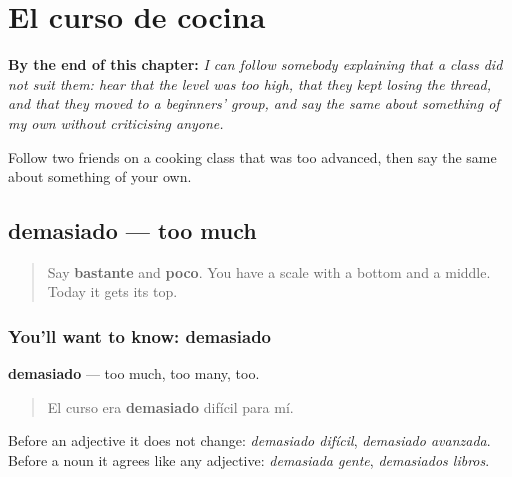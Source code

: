 
\chapter{El curso de cocina}
\label{ch:es-curso}

\begin{chapteropening}
\textbf{By the end of this chapter:} \emph{I can follow somebody explaining that a class did not suit them: hear that the level was too high, that they kept losing the thread, and that they moved to a beginners' group, and say the same about something of my own without criticising anyone.}

Follow two friends on a cooking class that was too advanced, then say the same about something of your own.
\end{chapteropening}

\section[demasiado]{demasiado — too much}

\label{lesson:ES-C471-demasiado}



\begin{quote}
Say \textbf{bastante} and \textbf{poco}. You have a scale with a bottom and a middle. Today it gets its top.
\end{quote}

\subsection*{You'll want to know: demasiado}
\textbf{demasiado} — too much, too many, too.

\begin{quote}
El curso era \textbf{demasiado} difícil para mí.
\end{quote}

Before an adjective it does not change: \emph{demasiado difícil}, \emph{demasiado avanzada}. Before a noun it agrees like any adjective: \emph{demasiada gente}, \emph{demasiados libros}.


